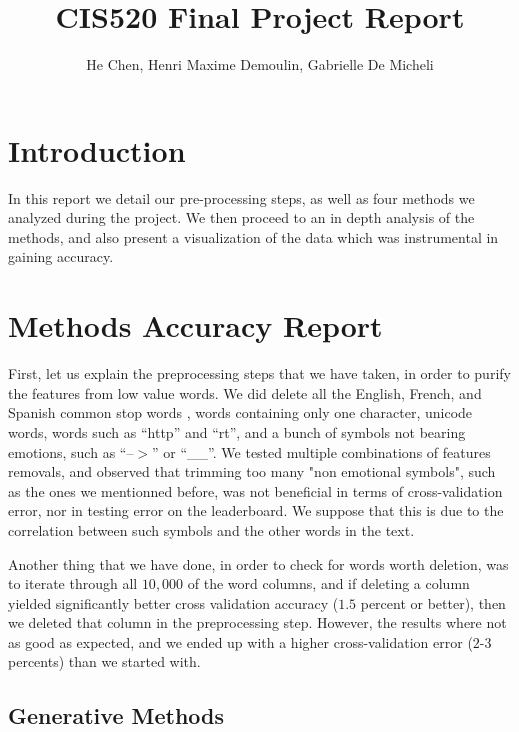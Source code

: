 \documentclass[11pt,twocolumn]{report}
\author{He Chen, Henri Maxime Demoulin, Gabrielle De Micheli}
\title{CIS520 Final Project Report}
\begin{document}
\maketitle
\section*{Introduction}
    In this report we detail our pre-processing steps, as well as four methods we analyzed during the project. We then proceed to an in depth analysis of the methods, and also present a visualization of the data which was instrumental in gaining accuracy.

\section*{Methods Accuracy Report}
    First, let us explain the preprocessing steps that we have taken, in order to purify the features from low value words. We did delete all the English, French, and Spanish common stop words \cite{stopwords}, words containing only one character, unicode words, words such as ``http'' and ``rt'', and a bunch of symbols not bearing emotions, such as ``--$>$'' or ``\_\_''. We tested multiple combinations of features removals, and observed that trimming too many "non emotional symbols", such as the ones we mentionned before, was not beneficial in terms of cross-validation error, nor in testing error on the leaderboard. We suppose that this is due to the correlation between such symbols and the other words in the text.
    \par
	Another thing that we have done, in order to check for words worth deletion, was to iterate through all $10,000$ of the word columns, and if deleting a column yielded significantly better cross validation accuracy ($1.5$ percent or better), then we deleted that column in the preprocessing step. However, the results where not as good as expected, and we ended up with a higher cross-validation error ($2$-$3$ percents) than we started with.
    
    \subsection*{Generative Methods}
\end{document}

